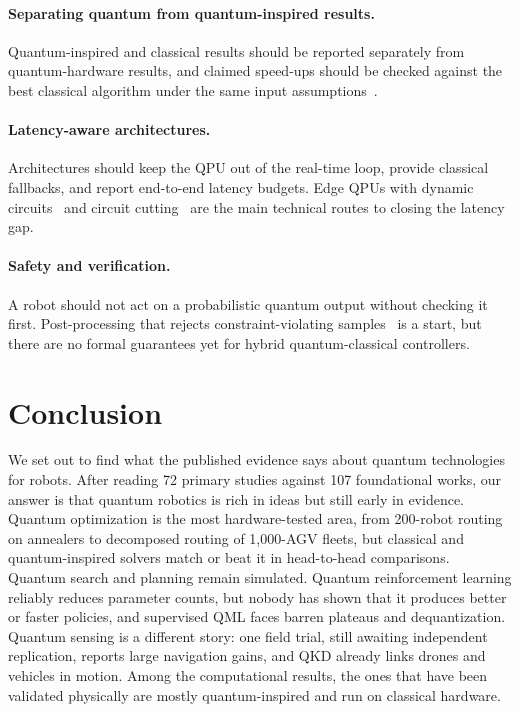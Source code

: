 \documentclass[acmsmall,screen,review]{acmart}
\begin{document}
\paragraph{Separating quantum from quantum-inspired results.} Quantum-inspired and classical results should be reported separately from quantum-hardware results, and claimed speed-ups should be checked against the best classical algorithm under the same input assumptions~\cite{Aaronson2015,Tang2019}.

\paragraph{Latency-aware architectures.} Architectures should keep the QPU out of the real-time loop, provide classical fallbacks, and report end-to-end latency budgets. Edge QPUs with dynamic circuits~\cite{Corcoles2021} and circuit cutting~\cite{Tang2021} are the main technical routes to closing the latency gap.

\paragraph{Safety and verification.} A robot should not act on a probabilistic quantum output without checking it first. Post-processing that rejects constraint-violating samples~\cite{Ohzeki2019} is a start, but there are no formal guarantees yet for hybrid quantum-classical controllers.



\section{Conclusion}\label{sec:conclusion}
We set out to find what the published evidence says about quantum technologies for robots. After reading 72 primary studies against 107 foundational works, our answer is that quantum robotics is rich in ideas but still early in evidence. Quantum optimization is the most hardware-tested area, from 200-robot routing on annealers to decomposed routing of 1,000-AGV fleets, but classical and quantum-inspired solvers match or beat it in head-to-head comparisons. Quantum search and planning remain simulated. Quantum reinforcement learning reliably reduces parameter counts, but nobody has shown that it produces better or faster policies, and supervised QML faces barren plateaus and dequantization. Quantum sensing is a different story: one field trial, still awaiting independent replication, reports large navigation gains, and QKD already links drones and vehicles in motion. Among the computational results, the ones that have been validated physically are mostly quantum-inspired and run on classical hardware.
\end{document}
